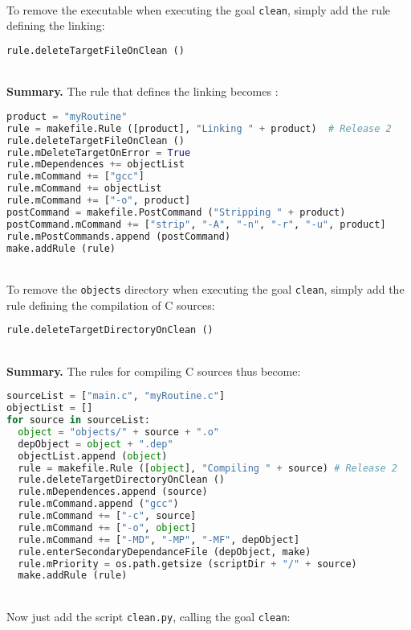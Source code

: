 \documentclass[a4paper,11pt]{extarticle}
\begin{document}
~\\To remove the executable when executing the goal \texttt{clean}, simply add the rule defining the linking:

\begin{lstlisting}[language=py]
rule.deleteTargetFileOnClean ()
\end{lstlisting}


~\\{\bf Summary.} The rule that defines the linking becomes :
\begin{lstlisting}[language=py]
product = "myRoutine"
rule = makefile.Rule ([product], "Linking " + product)  # Release 2
rule.deleteTargetFileOnClean ()
rule.mDeleteTargetOnError = True
rule.mDependences += objectList
rule.mCommand += ["gcc"]
rule.mCommand += objectList
rule.mCommand += ["-o", product]
postCommand = makefile.PostCommand ("Stripping " + product)
postCommand.mCommand += ["strip", "-A", "-n", "-r", "-u", product]
rule.mPostCommands.append (postCommand)
make.addRule (rule)
\end{lstlisting}


~\\To remove the \texttt{objects} directory when executing the goal \texttt{clean}, simply add the rule defining the compilation of C sources:

\begin{lstlisting}[language=py]
  rule.deleteTargetDirectoryOnClean ()
\end{lstlisting}

~\\{\bf Summary.} The rules for compiling C sources thus become:
\begin{lstlisting}[language=py]
sourceList = ["main.c", "myRoutine.c"]
objectList = []
for source in sourceList:
  object = "objects/" + source + ".o"
  depObject = object + ".dep"
  objectList.append (object)
  rule = makefile.Rule ([object], "Compiling " + source) # Release 2
  rule.deleteTargetDirectoryOnClean ()
  rule.mDependences.append (source)
  rule.mCommand.append ("gcc")
  rule.mCommand += ["-c", source]
  rule.mCommand += ["-o", object]
  rule.mCommand += ["-MD", "-MP", "-MF", depObject]
  rule.enterSecondaryDependanceFile (depObject, make)
  rule.mPriority = os.path.getsize (scriptDir + "/" + source)
  make.addRule (rule)
\end{lstlisting}

~\\Now just add the script \texttt{clean.py}, calling the goal \texttt{clean}:

\end{document}
